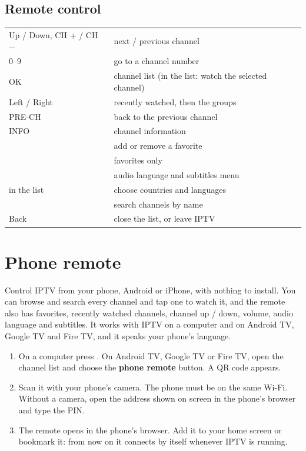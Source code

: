 \subsection{Remote control}
\begin{xltabular}{\linewidth}{@{}KX@{}}
Up / Down, CH + / CH $-$ & next / previous channel \\
0--9 & go to a channel number \\
OK & channel list (in the list: watch the selected channel) \\
Left / Right & recently watched, then the groups \\
PRE-CH & back to the previous channel \\
INFO & channel information \\
 & add or remove a favorite \\
 & favorites only \\
 & audio language and subtitles menu \\
 in the list & choose countries and languages \\
 & search channels by name \\
Back & close the list, or leave IPTV \\
\bottomrule
\end{xltabular}


\section{Phone remote}
\label{sec:remote}

Control IPTV from your phone, Android or iPhone, with nothing to install.
You can browse and search every channel and tap one to watch it, and the
remote also has favorites, recently watched channels, channel up / down,
volume, audio language and subtitles. It works with IPTV on a computer and
on Android TV, Google TV and Fire TV, and it speaks your phone's language.

\begin{enumerate}
  \item On a computer press . On Android TV, Google TV or Fire TV,
        open the channel list and choose the \textbf{phone remote} button. A
        QR code appears.
  \item Scan it with your phone's camera. The phone must be on the same Wi-Fi.
        Without a camera, open the address shown on screen in the phone's
        browser and type the PIN.
  \item The remote opens in the phone's browser. Add it to your home screen
        or bookmark it: from now on it connects by itself whenever IPTV is
        running.
\end{enumerate}

